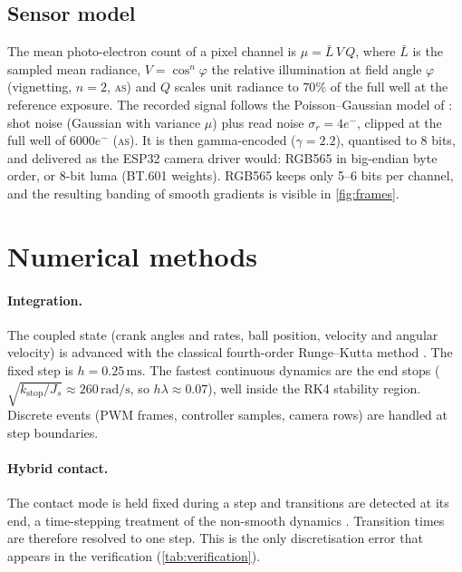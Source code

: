 \documentclass[10pt,a4paper]{article}
\newcommand{\un}[1]{\,\mathrm{#1}}
\newcommand{\tagAS}{\textsc{as}}
\begin{document}
\subsection{Sensor model}
The mean photo-electron count of a pixel channel is
$\mu=\bar L\,V\,Q$, where $\bar L$ is the sampled mean radiance, $V=\cos^n\varphi$ the relative
illumination at field angle $\varphi$ (vignetting, $n=2$, \tagAS) and $Q$ scales unit radiance
to $70\%$ of the full well at the reference exposure. The recorded signal follows the
Poisson--Gaussian model of \citet{foi2008practical}: shot noise (Gaussian with variance $\mu$)
plus read noise $\sigma_r=4e^-$, clipped at the full well of $6000e^-$ (\tagAS). It is then
gamma-encoded ($\gamma=2.2$), quantised to 8 bits, and delivered as the ESP32 camera driver
would: RGB565 in big-endian byte order, or 8-bit luma (BT.601 weights). RGB565 keeps only 5--6
bits per channel, and the resulting banding of smooth gradients is visible in
\cref{fig:frames}.

\section{Numerical methods}\label{sec:numerics}
\paragraph{Integration.} The coupled state (crank angles and rates, ball position, velocity
and angular velocity) is advanced with the classical fourth-order Runge--Kutta method
\citep{hairer1993solving}. The fixed step is $h=0.25\un{ms}$. The fastest continuous dynamics are
the end stops ($\sqrt{k_{\mathrm{stop}}/J_s}\approx260\un{rad/s}$, so $h\lambda\approx0.07$),
well inside the RK4 stability region. Discrete events (PWM frames, controller samples, camera
rows) are handled at step boundaries.

\paragraph{Hybrid contact.} The contact mode is held fixed during a step and transitions are
detected at its end, a time-stepping treatment of the non-smooth dynamics
\citep{acary2008numerical}. Transition times are therefore resolved to one step. This is the
only discretisation error that appears in the verification (\cref{tab:verification}).
\end{document}
